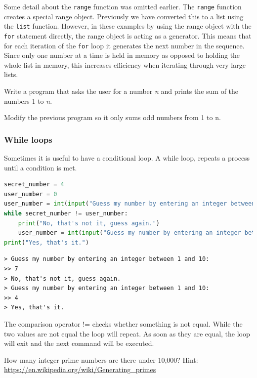 Some detail about the \texttt{range} function was omitted earlier. The \texttt{range} function creates a special range object. Previously we have converted this to a list using the \texttt{list} function. However, in these examples by using the range object with the \texttt{for} statement directly, the range object is acting as a generator. This means that for each iteration of the \texttt{for} loop it generates the next number in the sequence. Since only one number at a time is held in memory as opposed to holding the whole list in memory, this increases efficiency when iterating through very large lists.
		\begin{task}Write a program that asks the user for a number \textit{n} and prints the sum of the numbers 1 to \textit{n}.\end{task}
		\begin{task}Modify the previous program so it only sums odd numbers from 1 to n.\end{task}

		\subsubsection{While loops}
		Sometimes it is useful to have a conditional loop. A while loop, repeats a process until a condition is met.
\begin{lstlisting}[language=Python]
secret_number = 4
user_number = 0
user_number = int(input("Guess my number by entering an integer between 1 and 10: "))
while secret_number != user_number:
	print("No, that's not it, guess again.")	
	user_number = int(input("Guess my number by entering an integer between 1 and 10: "))	
print("Yes, that's it.")\end{lstlisting}
		\begin{verbatim}> Guess my number by entering an integer between 1 and 10: 
>> 7
> No, that's not it, guess again.
> Guess my number by entering an integer between 1 and 10:
>> 4
> Yes, that's it.\end{verbatim}
		The comparison operator != checks whether something is not equal. While the two values are not equal the loop will repeat. As soon as they are equal, the loop will exit and the next command will be executed.
\begin{advancedtask}How many integer prime numbers are there under 10,000? Hint: \url{https://en.wikipedia.org/wiki/Generating_primes}\end{advancedtask}

